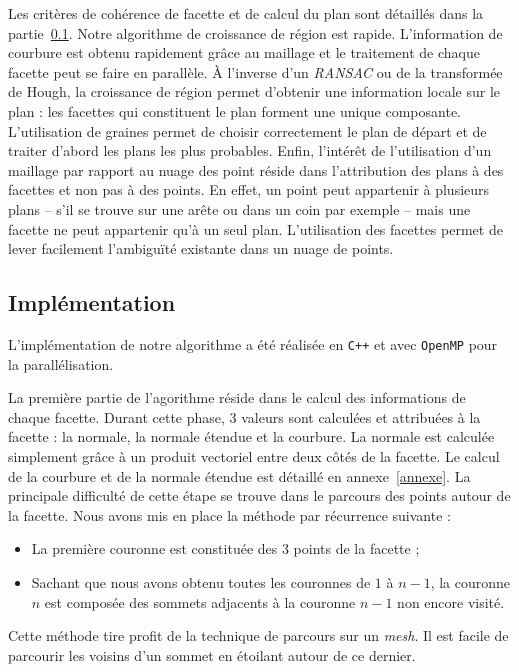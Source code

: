 ﻿\documentclass[12pt, twoside]{article}
\begin{document}
Les critères de cohérence de facette et de calcul du plan sont détaillés dans la partie~\ref{subsec:growthimpl}. Notre algorithme de croissance de région est rapide. L'information de courbure est obtenu rapidement grâce au maillage et le traitement de chaque facette peut se faire en parallèle. À l'inverse d'un \textit{RANSAC} ou de la transformée de Hough, la croissance de région permet d'obtenir une information locale sur le plan : les facettes qui constituent le plan forment une unique composante. L'utilisation de graines permet de choisir correctement le plan de départ et de traiter d'abord les plans les plus probables. Enfin, l'intérêt de l'utilisation d'un maillage par rapport au nuage des point réside dans l'attribution des plans à des facettes et non pas à des points. En effet, un point peut appartenir à plusieurs plans -- s'il se trouve sur une arête ou dans un coin par exemple -- mais une facette ne peut appartenir qu'à un seul plan. L'utilisation des facettes permet de lever facilement l'ambiguïté existante dans un nuage de points.

\subsection{Implémentation}
\label{subsec:growthimpl}
L'implémentation de notre algorithme a été réalisée en \texttt{C++} et avec \texttt{OpenMP} pour la parallélisation.

La première partie de l'agorithme réside dans le calcul des informations de chaque facette. Durant cette phase, 3 valeurs sont calculées et attribuées à la facette : la normale, la normale étendue et la courbure. La normale est calculée simplement grâce à un produit vectoriel entre deux côtés de la facette. Le calcul de la courbure et de la normale étendue est détaillé en annexe~\ref{annexe}. La principale difficulté de cette étape se trouve dans le parcours des points autour de la facette. Nous avons mis en place la méthode par récurrence suivante :
\begin{itemize}
  \item La première couronne est constituée des 3 points de la facette ;
  \item Sachant que nous avons obtenu toutes les couronnes de $1$ à $n-1$, la couronne $n$ est composée des sommets adjacents à la couronne $n-1$ non encore visité.
\end{itemize}
Cette méthode tire profit de la technique de parcours sur un \textit{mesh}. Il est facile de parcourir les voisins d'un sommet en étoilant autour de ce dernier.
\end{document}
